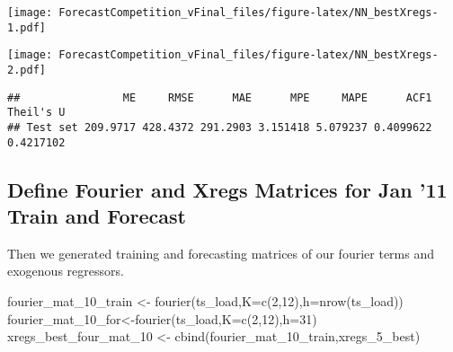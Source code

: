 \documentclass[
]{article}
\newenvironment{Shaded}{\begin{snugshade}}{\end{snugshade}}
\newcommand{\AttributeTok}[1]{\textcolor[rgb]{0.77,0.63,0.00}{#1}}
\newcommand{\CommentTok}[1]{\textcolor[rgb]{0.56,0.35,0.01}{\textit{#1}}}
\newcommand{\DecValTok}[1]{\textcolor[rgb]{0.00,0.00,0.81}{#1}}
\newcommand{\FunctionTok}[1]{\textcolor[rgb]{0.00,0.00,0.00}{#1}}
\newcommand{\NormalTok}[1]{#1}
\newcommand{\OtherTok}[1]{\textcolor[rgb]{0.56,0.35,0.01}{#1}}
\newcommand{\SpecialCharTok}[1]{\textcolor[rgb]{0.00,0.00,0.00}{#1}}
\newcommand{\StringTok}[1]{\textcolor[rgb]{0.31,0.60,0.02}{#1}}
\begin{document}
\texttt{[image: ForecastCompetition\_vFinal\_files/figure-latex/NN\_bestXregs-1.pdf]}

\begin{Shaded}
\end{Shaded}

\texttt{[image: ForecastCompetition\_vFinal\_files/figure-latex/NN\_bestXregs-2.pdf]}

\begin{Shaded}
\end{Shaded}

\begin{verbatim}
##                ME     RMSE      MAE      MPE     MAPE      ACF1 Theil's U
## Test set 209.9717 428.4372 291.2903 3.151418 5.079237 0.4099622 0.4217102
\end{verbatim}

\hypertarget{define-fourier-and-xregs-matrices-for-jan-11-train-and-forecast}{%
\subsection{Define Fourier and Xregs Matrices for Jan '11 Train and
Forecast}\label{define-fourier-and-xregs-matrices-for-jan-11-train-and-forecast}}

Then we generated training and forecasting matrices of our fourier terms
and exogenous regressors.

\begin{Shaded}
\begin{Highlighting}[]
\NormalTok{fourier\_mat\_10\_train }\OtherTok{\textless{}{-}} \FunctionTok{fourier}\NormalTok{(ts\_load,}\AttributeTok{K=}\FunctionTok{c}\NormalTok{(}\DecValTok{2}\NormalTok{,}\DecValTok{12}\NormalTok{),}\AttributeTok{h=}\FunctionTok{nrow}\NormalTok{(ts\_load))}
\NormalTok{fourier\_mat\_10\_for}\OtherTok{\textless{}{-}}\FunctionTok{fourier}\NormalTok{(ts\_load,}\AttributeTok{K=}\FunctionTok{c}\NormalTok{(}\DecValTok{2}\NormalTok{,}\DecValTok{12}\NormalTok{),}\AttributeTok{h=}\DecValTok{31}\NormalTok{)}
\NormalTok{xregs\_best\_four\_mat\_10 }\OtherTok{\textless{}{-}} \FunctionTok{cbind}\NormalTok{(fourier\_mat\_10\_train,xregs\_5\_best)}
\end{Highlighting}
\end{Shaded}
\end{document}
